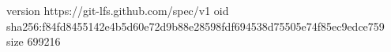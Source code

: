 version https://git-lfs.github.com/spec/v1
oid sha256:f84fd8455142e4b5d60e72d9b88e28598fdf694538d75505e74f85ec9edce759
size 699216
